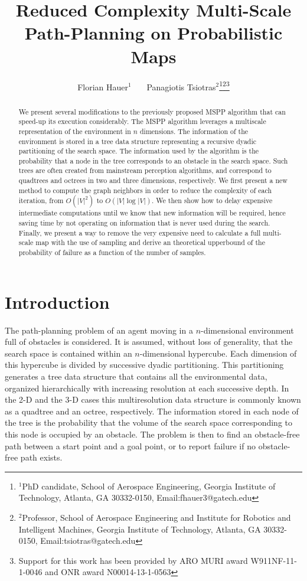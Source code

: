 \documentclass[letterpaper, 10 pt, conference]{ieeeconf}
\title{\LARGE \bf
Reduced Complexity Multi-Scale Path-Planning on Probabilistic Maps}
\author{Florian Hauer$^{1}$~~~ Panagiotis Tsiotras$^{2}$\thanks{$^{1}$PhD candidate, School of Aerospace Engineering, Georgia Institute of Technology, Atlanta, GA 30332-0150{, Email:\rm fhauer3@gatech.edu}}\thanks{$^{2}$Professor, School of Aerospace Engineering and Institute for Robotics and Intelligent Machines, Georgia Institute of Technology, Atlanta, GA 30332-0150{, Email:\rm tsiotras@gatech.edu}}\thanks{Support for this work has been provided by ARO MURI award W911NF-11-1-0046 and ONR award N00014-13-1-0563}}
\theoremstyle{definition}
\begin{document}
\maketitle



\begin{abstract}
We present several modifications to the previously proposed MSPP algorithm that can speed-up its execution considerably.
The MSPP algorithm leverages a multiscale representation of the environment in $n$ dimensions.
The information of the environment is stored in a tree data structure representing a recursive dyadic partitioning of the search space. The information used by the algorithm is the probability that a node in the tree corresponds to an obstacle in the search space. Such trees are often created from mainstream perception algorithms, and correspond to quadtrees and octrees in two and three dimensions, respectively.
We first present a new method to compute the graph neighbors in order to reduce the complexity of each iteration, from $O(\vert V\vert^2)$ to $O(\vert V\vert \log \vert V\vert)$.
We then show how to delay expensive intermediate computations until we know that new information will be required, hence saving time by not operating on information that is never used during the search.
Finally, we present a way to remove the very expensive need to calculate a full multi-scale map with the use of sampling and derive an theoretical upperbound of the probability of failure as a function of the number of samples.
\end{abstract}


\section{Introduction}

The path-planning problem of an agent moving in a $n$-dimensional environment full of obstacles is considered.
It is assumed, without loss of generality, that the search space is contained within an $n$-dimensional hypercube.
Each dimension of this hypercube is divided by successive dyadic partitioning.
This partitioning generates a tree data structure that contains
all the environmental data, organized hierarchically with increasing resolution at each successive depth.
In the 2-D and the 3-D cases this multiresolution data structure is commonly known as a quadtree and an octree, respectively. The information stored in each node of the tree is the probability that the volume of the search space corresponding to this node is occupied by an
obstacle.
The problem is then to find an obstacle-free path between a start point and a goal point, or to report failure if no obstacle-free path exists.
\end{document}
